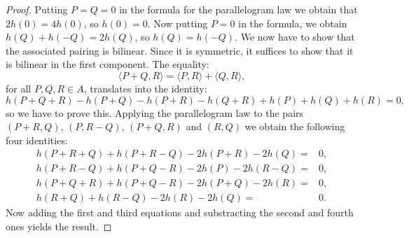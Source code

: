 \documentclass[a4paper, 12pt]{amsart}
\theoremstyle{definition}
\theoremstyle{plain}
\theoremstyle{plain}
\theoremstyle{plain}
\theoremstyle{plain}
\theoremstyle{remark}
\theoremstyle{remark}
\theoremstyle{plain}
\begin{document}
	\begin{proof}
		Putting $P=Q=0$ in the formula for the parallelogram law we obtain that $2h(0)=4h(0)$, so $h(0)=0$. Now putting $P=0$ in the formula, we obtain $h(Q)+h(-Q)=2h(Q)$, so $h(Q)=h(-Q)$. We now have to show that the associated pairing is bilinear. Since it is symmetric, it suffices to show that it is bilinear in the first component. The equality:
		\begin{equation*}
			\langle P+Q,R\rangle=\langle P,R\rangle+\langle Q,R\rangle,
		\end{equation*}
		for all $P,Q,R\in A$, translates into the identity:
		\begin{equation*}
			h(P+Q+R)-h(P+Q)-h(P+R)-h(Q+R)+h(P)+h(Q)+h(R)=0,
		\end{equation*}
		so we have to prove this. Applying the parallelogram law to the pairs $(P+R,Q)$, $(P,R-Q)$, $(P+Q,R)$ and $(R,Q)$ we obtain the following four identities:
		\begin{align*}
			h(P+R+Q)+h(P+R-Q)-2h(P+R)-2h(Q)=&0,\\
			h(P+R-Q)+h(P+Q-R)-2h(P)-2h(R-Q)=&0,\\
			h(P+Q+R)+h(P+Q-R)-2h(P+Q)-2h(R)=&0,\\
			h(R+Q)+h(R-Q)-2h(R)-2h(Q)=&0.
		\end{align*}
		Now adding the first and third equations and substracting the second and fourth ones yields the result.
		

\end{proof}
\end{document}
